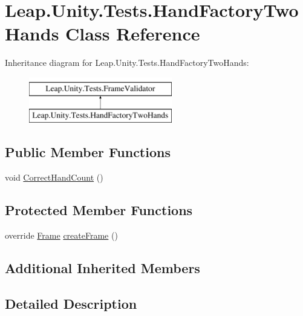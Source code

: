 \hypertarget{class_leap_1_1_unity_1_1_tests_1_1_hand_factory_two_hands}{}\section{Leap.\+Unity.\+Tests.\+Hand\+Factory\+Two\+Hands Class Reference}
\label{class_leap_1_1_unity_1_1_tests_1_1_hand_factory_two_hands}
Inheritance diagram for Leap.\+Unity.\+Tests.\+Hand\+Factory\+Two\+Hands\+:\begin{figure}[H]
\begin{center}
\leavevmode
\includegraphics[height=2.000000cm]{class_leap_1_1_unity_1_1_tests_1_1_hand_factory_two_hands}
\end{center}
\end{figure}
\subsection*{Public Member Functions}
\begin{DoxyCompactItemize}
\item 
void \mbox{\hyperlink{class_leap_1_1_unity_1_1_tests_1_1_hand_factory_two_hands_acf5d61eadd85814d90e0dd53b014fd6f}{Correct\+Hand\+Count}} ()
\end{DoxyCompactItemize}
\subsection*{Protected Member Functions}
\begin{DoxyCompactItemize}
\item 
override \mbox{\hyperlink{class_leap_1_1_frame}{Frame}} \mbox{\hyperlink{class_leap_1_1_unity_1_1_tests_1_1_hand_factory_two_hands_ab929744527e15f0ad07ff17d0e867355}{create\+Frame}} ()
\end{DoxyCompactItemize}
\subsection*{Additional Inherited Members}


\subsection{Detailed Description}


